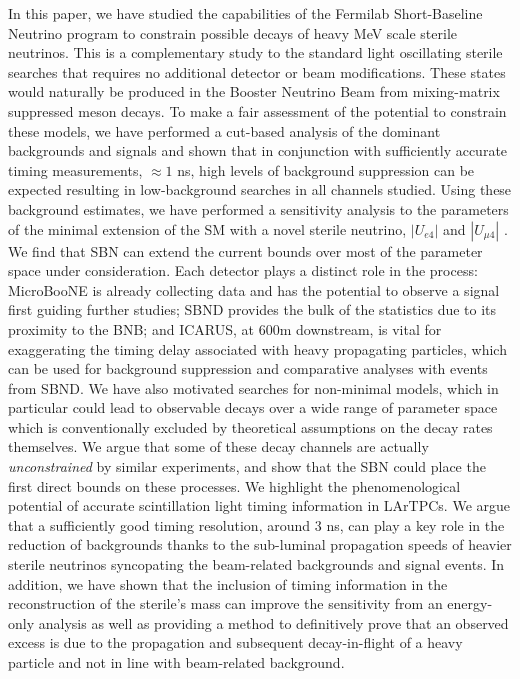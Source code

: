 \documentclass[11pt, a4paper]{article}
\begin{document}
In this paper, we have studied the capabilities of the Fermilab Short-Baseline
Neutrino program to constrain possible decays of heavy MeV scale sterile
neutrinos. This is a complementary study to the standard light oscillating
sterile searches that requires no additional detector or beam modifications.
These states would naturally be produced in the Booster Neutrino Beam from
mixing-matrix suppressed meson decays. To make a fair assessment of the
potential to constrain these models, we have performed a cut-based analysis of
the dominant backgrounds and signals and shown that in conjunction with
sufficiently accurate timing measurements, $\approx 1$ ns, high levels of
background suppression can be expected resulting in low-background searches in
all channels studied. Using these background estimates, we have performed a
sensitivity analysis to the parameters of the minimal extension of the SM with
a novel sterile neutrino, $|U_{e4}|$ and $|U_{\mu4}|$ . 
%
We find that SBN can extend the current bounds over most of the parameter space
under consideration. Each detector plays a distinct role in the process:
MicroBooNE is already collecting data and has the potential to observe a signal
first guiding further studies; SBND provides the bulk of the statistics due to
its proximity to the BNB; and ICARUS, at 600m downstream, is vital for
exaggerating the timing delay associated with heavy propagating particles,
which can be used for background suppression and comparative analyses with
events from SBND.
%
We have also motivated searches for non-minimal models, which in particular
could lead to observable decays over a wide range of parameter space which is
conventionally excluded by theoretical assumptions on the decay rates
themselves. We argue that some of these decay channels are actually
\emph{unconstrained} by similar experiments, and show that the SBN could place
the first direct bounds on these processes.
%
We highlight the phenomenological potential of accurate scintillation light
timing information in LArTPCs. We argue that a sufficiently good timing
resolution, around $3$ ns, can play a key role in the reduction of backgrounds
thanks to the sub-luminal propagation speeds of heavier sterile neutrinos
syncopating the beam-related backgrounds and signal events. In addition, we
have shown that the inclusion of timing information in the reconstruction of
the sterile's mass can improve the sensitivity from an energy-only analysis as
well as providing a method to definitively prove that an observed excess is due
to the propagation and subsequent decay-in-flight of a heavy particle and not
in line with beam-related background.
%
\end{document}

